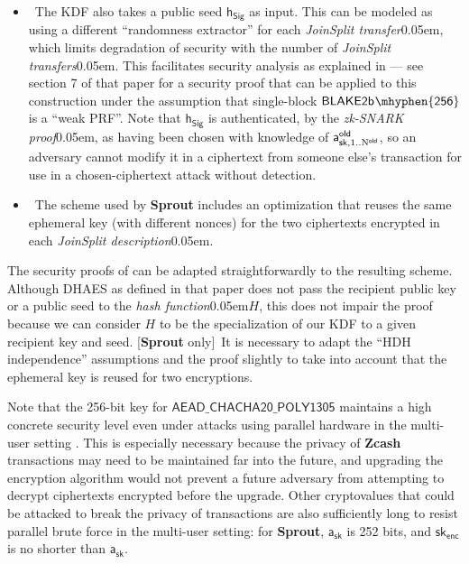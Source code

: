 \documentclass{article}
\newcommand{\saplingcolor}{green}
\newcommand{\sprout}[1]{}
\newcommand{\notsprout}[1]{#1}
\newcommand{\setsapling}{\color{\saplingcolor}}
\newcommand{\sapling}[1]{\texorpdfstring{{\setsapling{#1}}}{#1}}
\newcommand{\sprout}[1]{#1}
\newcommand{\notsprout}[1]{}
\newcommand{\setsapling}{}
\newcommand{\sapling}[1]{}
\numberwithin{theorem}{subsection}
\newcommand{\term}[1]{\textsl{#1}\kern 0.05em\xspace}
\newcommand{\termbf}[1]{\textbf{#1}\xspace}
\newcommand{\Zcash}{\termbf{Zcash}}
\newcommand{\Sprout}{\termbf{Sprout}}
\newcommand{\SproutOrZcash}{\notsprout{\Sprout}\sprout{\Zcash}}
\newcommand{\Sapling}{\termbf{Sapling}}
\newcommand{\joinSplitDescription}{\term{JoinSplit description}}
\newcommand{\joinSplitTransfer}{\term{JoinSplit transfer}}
\newcommand{\joinSplitTransfers}{\term{JoinSplit transfers}}
\newcommand{\notesCiphertext}{\term{transmitted notes ciphertext}}
\newcommand{\zkSNARKProof}{\term{zk-SNARK proof}}
\newcommand{\hashFunction}{\term{hash function}}
\newcommand{\BlakeTwob}[1]{\mathsf{BLAKE2b\kern 0.05em\mhyphen{#1}}}
\newcommand{\AuthPrivate}{\mathsf{a_{sk}}}
\newcommand{\AuthPrivateOld}[1]{\mathsf{a^{old}_{sk,\mathnormal{#1}}}}
\newcommand{\TransmitPublic}{\mathsf{pk_{enc}}}
\newcommand{\TransmitPrivate}{\mathsf{sk_{enc}}}
\newcommand{\SymSpecific}{\mathsf{AEAD\_CHACHA20\_POLY1305}}
\newcommand{\OutputUnique}{\upmu}
\newcommand{\hSig}{\mathsf{h_{Sig}}}
\newcommand{\allN}[1]{\mathrm{1}..\mathrm{N}^\mathsf{#1}}
\newcommand{\allOld}{\allN{old}}
\newcommand{\sproutonly}[1]{\notsprout{[\Sprout only]\,} {#1}}
\begin{document}
\begin{itemize}
        break the Elliptic Curve Diffie-Hellman Problem on Curve25519 (without breaking
        $\SymSpecific$ as an authenticated encryption scheme or $\BlakeTwob{256}$ as
        a KDF) would not help to decrypt the \notesCiphertext unless
        $\TransmitPublic$ is known or guessed.
  \item \sproutonly{The KDF also takes a public seed $\hSig$ as input.
        This can be modeled as using a different ``randomness extractor'' for each
        \joinSplitTransfer, which limits degradation of security with the number of
        \joinSplitTransfers.
        This facilitates security analysis as explained in \cite{DGKM2011} --- see
        section 7 of that paper for a security proof that can be applied to this
        construction under the assumption that single-block $\BlakeTwob{256}$ is a
        ``weak PRF''.
        Note that $\hSig$ is authenticated, by the \zkSNARKProof\!\!, as having been chosen
        with knowledge of $\AuthPrivateOld{\allOld}$, so an adversary cannot
        modify it in a ciphertext from someone else's transaction for use in a
        chosen-ciphertext attack without detection.}
        \sapling{In \Sapling, $\OutputUnique$ plays a similar rôle as a public seed.}
  \item \sproutonly{The scheme used by \SproutOrZcash includes an optimization that reuses
        the same ephemeral key (with different nonces) for the two ciphertexts
        encrypted in each \joinSplitDescription.}
\end{itemize}

The security proofs of \cite{ABR1999} can be adapted straightforwardly to the
resulting scheme. Although DHAES as defined in that paper does not pass the
recipient public key or a public seed to the \hashFunction $H$, this does not
impair the proof because we can consider $H$ to be the specialization of our
KDF to a given recipient key and seed. \sproutonly{It is necessary to adapt the
``HDH independence'' assumptions and the proof slightly to take into account
that the ephemeral key is reused for two encryptions.}

Note that the 256-bit key for $\SymSpecific$ maintains a high concrete security
level even under attacks using parallel hardware \cite{Bern2005} in the multi-user
setting \cite{Zave2012}. This is especially necessary because the privacy of
\Zcash transactions may need to be maintained far into the future, and upgrading
the encryption algorithm would not prevent a future adversary from attempting
to decrypt ciphertexts encrypted before the upgrade. Other cryptovalues that
could be attacked to break the privacy of transactions are also sufficiently long
to resist parallel brute force in the multi-user setting: \notsprout{for \Sprout,}
$\AuthPrivate$ is 252 bits, and $\TransmitPrivate$ is no shorter than $\AuthPrivate$.
\end{document}
